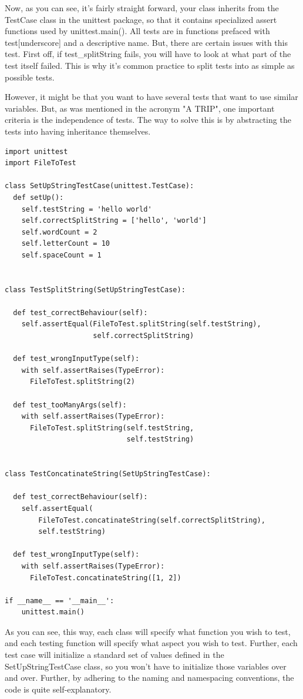 \documentclass[10pt,a4paper]{article}
\begin{document}
Now, as you can see, it's fairly straight forward, your class inherits from the TestCase class in the unittest package, so that it contains specialized assert functions used by unittest.main(). All tests are in functions prefaced with test[underscore] and a descriptive name. But, there are certain issues with this test. 
First off, if test\_splitString fails, you will have to look at what part of the test itself failed. This is why it's common practice to split tests into as simple as possible tests. 

However, it might be that you want to have several tests that want to use similar variables. But, as was mentioned in the acronym "A TRIP", one important criteria is the independence of tests. The way to solve this is by abstracting the tests into having inheritance themselves.

\begin{lstlisting}
import unittest
import FileToTest 

class SetUpStringTestCase(unittest.TestCase):
  def setUp():
    self.testString = 'hello world'
    self.correctSplitString = ['hello', 'world']
    self.wordCount = 2
    self.letterCount = 10
    self.spaceCount = 1


class TestSplitString(SetUpStringTestCase):

  def test_correctBehaviour(self):
    self.assertEqual(FileToTest.splitString(self.testString), 
                     self.correctSplitString)

  def test_wrongInputType(self):
    with self.assertRaises(TypeError):
      FileToTest.splitString(2)

  def test_tooManyArgs(self):
    with self.assertRaises(TypeError):
      FileToTest.splitString(self.testString, 
                             self.testString)


class TestConcatinateString(SetUpStringTestCase):

  def test_correctBehaviour(self):
    self.assertEqual(
        FileToTest.concatinateString(self.correctSplitString), 
        self.testString)

  def test_wrongInputType(self):
    with self.assertRaises(TypeError):
      FileToTest.concatinateString([1, 2])
          
if __name__ == '__main__':
    unittest.main()

\end{lstlisting}

As you can see, this way, each class will specify what function you wish to test, and each testing function will specify what aspect you wish to test. Further, each test case will initialize a standard set of values defined in the SetUpStringTestCase class, so you won't have to initialize those variables over and over. Further, by adhering to the naming and namespacing conventions, the code is quite self-explanatory.
\end{document}
